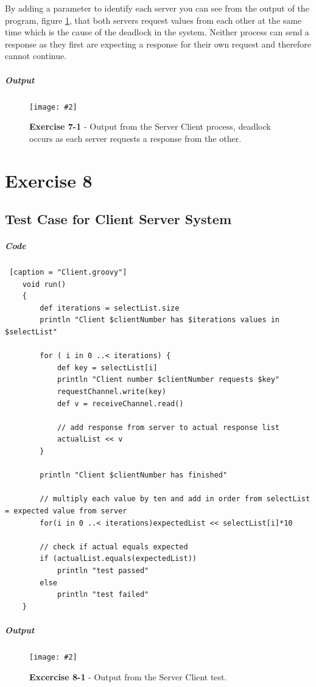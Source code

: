 \documentclass[10pt, a4paper]{article}
\newcommand{\figuremacro}[5]{
    \begin{figure}[#1]
        \centering
        \texttt{[image: \#2]}
        \caption[#3]{\textbf{#3}#4}
        \label{fig:#2}
    \end{figure}
}
\begin{document}
    By adding a parameter to identify each server you can see from the output of the program, figure \ref{fig:deadlock}, that both servers request values from each other at the same time which is the cause of the deadlock in the system. Neither process can send a response as they first are expecting a response for their own request and therefore cannot continue.
	
	\subparagraph{Output} \hfill
				
	\figuremacro{H}{deadlock}{Exercise 7-1}{ -  Output from the Server Client process, deadlock occurs as each server requests a response from the other.}{0.5}
	
	\setcounter{section}{8}
   \section*{Exercise 8}
   
   \setcounter{subsection}{0}
   \subsection{Test Case for Client Server System}
   \subparagraph{Code} \hfill
   \begin{lstlisting} [caption = "Client.groovy"]
   	void run()
   	{
   		def iterations = selectList.size
   		println "Client $clientNumber has $iterations values in $selectList"
   	
   		for ( i in 0 ..< iterations) {
   			def key = selectList[i]
   			println "Client number $clientNumber requests $key"
   			requestChannel.write(key)
   			def v = receiveChannel.read()
   	
  	 		// add response from server to actual response list
   			actualList << v
   		}
   	
   		println "Client $clientNumber has finished"
   	
   		// multiply each value by ten and add in order from selectList = expected value from server
   		for(i in 0 ..< iterations)expectedList << selectList[i]*10
   	
   		// check if actual equals expected 
   		if (actualList.equals(expectedList))
   			println "test passed"
   		else
   			println "test failed"
   	}\end{lstlisting}
   
   \subparagraph{Output}
   
  	\figuremacro{H}{testClient}{Excercise 8-1}{ -  Output from the Server Client test.}{0.3}
   
\end{document}
